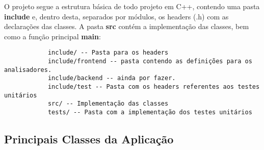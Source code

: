 \documentclass[11pt]{article}
\begin{document}
		O projeto segue a estrutura básica de todo projeto em C++, contendo uma pasta \textbf{include} e, dentro desta, separados por módulos, os headers (.h) com as declarações das classes. A pasta \textbf{src} contém a implementação das classes, bem como a função principal \textbf{main}:
		
		\begin{verbatim}
			include/ -- Pasta para os headers
			include/frontend -- pasta contendo as definições para os analisadores.
			include/backend -- ainda por fazer.
			include/test -- Pasta com os headers referentes aos testes unitários
			src/ -- Implementação das classes
			tests/ -- Pasta com a implementação dos testes unitários 
		\end{verbatim}
		
		
		
	\subsection{Principais Classes da Aplicação}
		
\end{document}
